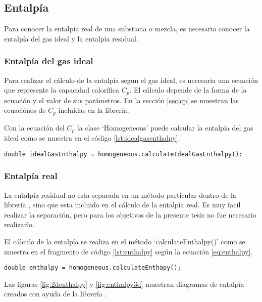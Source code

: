 \subsection{Entalpía}\label{subsec:enthalpy}

	Para conocer la entalpía real de una substacia o mezcla, es necesario conocer la entalpía del gas ideal y la entalpía residual.

\subsubsection{Entalpía del gas ideal}
	Para realizar el cálculo de la entalpía segun el gas ideal, es necesaria una ecuación que represente la capacidad calorífica $C_p$. El cálculo depende de la forma de la ecuación y el valor de sus parámetros. En la sección \ref{sec:cp} se muestran las ecuaciónes de $C_p$ incluidas en la librería.

	Con la ecuación del $C_p$ la clase `Homogeneous' puede calcular la entalpía del gas ideal como se muestra en el código \ref{lst:idealgasenthalpy}.

	\begin{lstlisting}[label={lst:idealgasenthalpy},caption={Cálculo de la entalpía del gas ideal.}]
	double idealGasEnthalpy = homogeneous.calculateIdealGasEnthalpy():
	\end{lstlisting}
	
\subsubsection{Entalpía real}

	La entalpía residual no esta separada en un método particular dentro de la librería \Materia, sino que esta incluido en el cálculo de la entalpía real. Es muy facil realizar la separación, pero para los objetivos de la presente tesis no fue necesario realizarlo.

	El cálculo de la entalpía se realiza en el método `calculateEnthalpy()' como se muestra en el fragmento de código \ref{lst:enthalpy} según la ecuación \ref{eq:enthalpy}. 

\begin{lstlisting}[caption={Cálculo de la entalpía real},label={lst:enthalpy}]
	double enthalpy = homogeneous.calculateEnthapy();
\end{lstlisting}
	
	Las figuras \ref{fig:2denthalpy} y \ref{fig:enthalpy3d} muestran diagramas de entalpía creados con ayuda de la librería \Materia.

